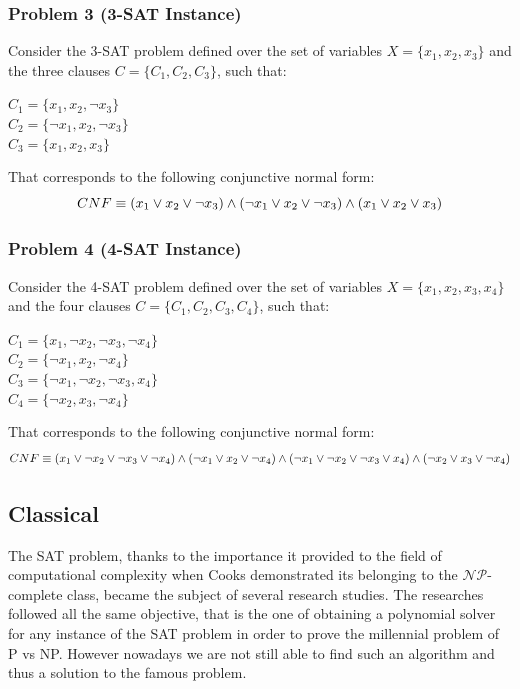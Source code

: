 \documentclass[english]{article}
\begin{document}
			\subsubsection{Problem 3 (3-SAT Instance)}
			\label{sec:problem3}
				Consider the 3-SAT problem defined over the set of variables $X=\{x_1, x_2, x_3\}$ and the three clauses $C=\{C_1, C_2, C_3\}$, such that:
				\begin{center}
					$C_1 = \{x_1, x_2, \neg x_3\}$ \\
					$C_2 = \{\neg x_1, x_2, \neg x_3\}$ \\
					$C_3 = \{x_1, x_2, x_3\}$
				\end{center}
				That corresponds to the following conjunctive normal form:
				\begin{equation*}
				\centering
				CNF \equiv (x_1 \lor x_2 \lor \neg x_3) 
				\land (\neg x_1 \lor x_2 \lor \neg x_3)
				\land (x_1 \lor x_2 \lor x_3)
				\end{equation*}
			
			\subsubsection{Problem 4 (4-SAT Instance)}
			\label{sec:problem4}
				Consider the 4-SAT problem defined over the set of variables $X=\{x_1, x_2, x_3, x_4\}$ and the four clauses $C=\{C_1, C_2, C_3, C_4\}$, such that:
				\begin{center}
					$C_1 = \{x_1, \neg x_2, \neg x_3, \neg x_4\}$\\
					$C_2 = \{\neg x_1, x_2, \neg x_4\}$\\
					$C_3 = \{\neg x_1, \neg x_2, \neg x_3, x_4\}$\\
					$C_4 = \{\neg x_2, x_3, \neg x_4\}$
				\end{center}
				That corresponds to the following conjunctive normal form:
				\begin{equation*}
					\centering
					CNF \equiv (x_1 \lor \neg x_2 \lor \neg x_3 \lor \neg x_4)
							\land (\neg x_1 \lor x_2 \lor \neg x_4)
							\land (\neg x_1 \lor \neg x_2 \lor \neg x_3 \lor x_4)
							\land (\neg x_2 \lor x_3 \lor \neg x_4)
				\end{equation*}
		
		\subsection{Classical}
		\label{sec:satClassical}
			The SAT problem, thanks to the importance it provided to the field of computational complexity when Cooks demonstrated its belonging to the $\mathcal{N}\mathcal{P}$-complete class, became the subject of several research studies. The researches followed all the same objective, that is the one of obtaining a polynomial solver for any instance of the SAT problem in order to prove the millennial problem of P vs NP. However nowadays we are not still able to find such an algorithm and thus a solution to the famous problem. \\
			
\end{document}
